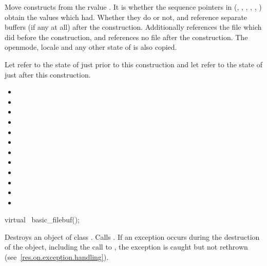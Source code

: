 \begin{itemdescr}
\pnum
\effects Move constructs from the rvalue . It
is  whether the sequence pointers in 
(, , ,
, , ) obtain
the values which  had. Whether they do or not, 
and  reference separate buffers (if any at all) after the
construction. Additionally  references the file
which  did before the construction, and
 references no file after the construction. The
openmode, locale and any other state of  is also
copied.

\pnum
\ensures Let  refer to the state of
 just prior to this construction and let 
refer to the state of  just after this construction.

\begin{itemize}
\item {}
\item {}
\item {}
\item {}
\item {}
\item {}
\item {}
\item {}
\item {}
\item {}
\item {}
\item {}
\end{itemize}
\end{itemdescr}

%
\begin{itemdecl}
virtual ~basic_filebuf();
\end{itemdecl}

\begin{itemdescr}
\pnum
\effects
Destroys an object of class
.
Calls
.
If an exception occurs during the destruction of the object, including the call to , the exception is caught but not rethrown (see~\ref{res.on.exception.handling}).
\end{itemdescr}

